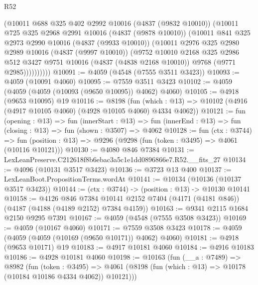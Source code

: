 \begin{lexlean}{R52}
\begin{coremodule}
            (@10011
              @688
              @325
              @402
              @2992
              @10016
              (@4837 (@9832 @10010))
              (@10011
                @725
                @325
                @2968
                @2991
                @10016
                (@4837 (@9878 @10010))
                (@10011
                  @841
                  @325
                  @2973
                  @2990
                  @10016
                  (@4837 (@9933 @10010))
                  (@10011
                    @2976
                    @325
                    @2980
                    @2989
                    @10016
                    (@4837 (@9997 @10010))
                    (@9752
                      @10010
                      @2168
                      @325
                      @2986
                      @512
                      @3427
                      @9751
                      @10016
                      (@4837 (@4838 @2168 @10010))
                      @9768
                      (@9771 @2985))))))))))
@10091 := @4059 (@4548 (@7555 @3511 @3423))
@10093 := @4059 (@10091 @4060)
@10095 := @7559 @3511 @3423
@10102 := @4059 (@4059 (@4059 (@10093 (@9650 @10095)) @4062) @4060)
@10105 := @4918 (@9653 @10095) @19
@10116 := @8198
    (fun (which : @13) => @10102 (@4916 (@4917 @10105 @4060) (@4928 @10105 @4060) @4334 @4062))
@10121 := fun (opening : @13) =>
  fun (innerStart : @13) =>
  fun (innerEnd : @13) => fun (closing : @13) => fun (shown : @3507) => @4062
@10128 := fun (ctx : @3744) =>
  fun (position : @13) => @9296 (@9298 (fun (token : @3495) => @4061 (@10116 @10121)))
@10130 := @4080 @846 @7384
@10131 := LexLeanPreserve.C212618f8b6ebac3a5c1e1dd0896866e7.R52.__fits_27
@10134 := @4096 (@10131 @3517 @3423)
@10136 := @3723 @13 @400
@10137 := LexLeanBoot.PropositionTerms.wordAt
@10141 := @10134 (@10136 (@10137 @3517 @3423))
@10144 := (ctx : @3744) -> (position : @13) -> @10130 @10141
@10158 := @4126
    @846
    @7384
    @10141
    @2152
    @7404
    (@4171 (@4181 @846))
    (@4187 (@4188 (@4189 @2152) @7384 @4159))
@10163 := @9341 @2115 @1684 @2150 @9295 @7391
@10167 := @4059 (@4548 (@7555 @3508 @3423))
@10169 := @4059 (@10167 @4060)
@10171 := @7559 @3508 @3423
@10178 := @4059 (@4059 (@4059 (@10169 (@9650 @10171)) @4062) @4060)
@10181 := @4918 (@9653 @10171) @19
@10183 := @4917 @10181 @4060
@10184 := @4916 @10183
@10186 := @4928 @10181 @4060
@10198 := @10163
    (fun (__a : @7489) =>
    @8982
      (fun (token : @3495) =>
      @4061 (@8198 (fun (which : @13) => @10178 (@10184 @10186 @4334 @4062)) @10121)))

\end{coremodule}
\end{lexlean}
